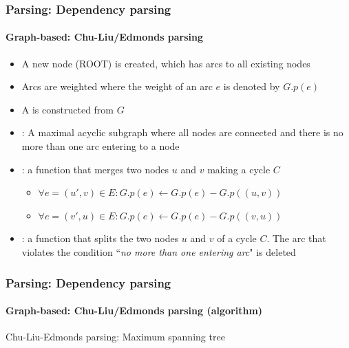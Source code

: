 \documentclass[xcolor=table]{beamer}
\begin{document}
\begin{frame}
\frametitle{Parsing: Dependency parsing}
\framesubtitle{Graph-based: Chu-Liu/Edmonds parsing}

\begin{itemize}
	\item A new node (ROOT) is created, which has arcs to all existing nodes 
	\item Arcs are weighted where the weight of an arc $e$ is denoted by $G.p(e)$
	\item A  is constructed from $G$
	\item {}: A maximal acyclic subgraph where all nodes are connected and there is no more than one arc entering to a node
	\item {}: a function that merges two nodes $u$ and $v$ making a cycle $C$
	\begin{itemize}
		\item $\forall e = (u', v) \in E : G.p(e) \leftarrow G.p(e) - G.p((u, v)) $
		\item $\forall e = (v', u) \in E : G.p(e) \leftarrow G.p(e) - G.p((v, u)) $
	\end{itemize}
	\item {}: a function that splits the two nodes $u$ and $v$ of a cycle $C$. The arc that violates the condition ``\textit{no more than one entering arc}" is deleted
\end{itemize}
 
\end{frame}

\begin{frame}
\frametitle{Parsing: Dependency parsing}
\framesubtitle{Graph-based: Chu-Liu/Edmonds parsing (algorithm)}


\begin{block}{Chu-Liu-Edmonds parsing: Maximum spanning tree}
	\scriptsize\vspace{-3pt}
	\begin{algorithm}[H]
		
		
	\end{algorithm}
\end{block}

\end{frame}
\end{document}
